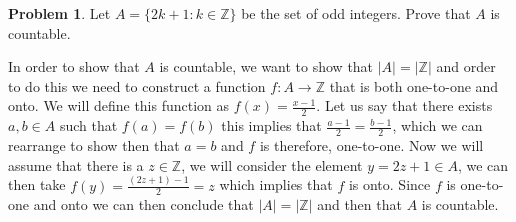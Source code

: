 \documentclass[11pt]{article}
\theoremstyle{definition}
\newtheorem{problem}{Problem}
\newcommand{\Z}{\mathbb{Z}}
\begin{document}
\begin{problem}
Let $A = \{ 2 k + 1 : k \in \Z\}$ be the set of odd integers. Prove that $A$ is countable. 
\end{problem}

In order to show that $A$ is countable, we want to show that $|A|=|\mathbb{Z}|$ and order to do this we need to construct a function $f:A \rightarrow \mathbb{Z}$ that is both one-to-one and onto. We will define this function as $f(x) = \frac{x-1}{2}$. Let us say that there exists $a,b\in A$ such that $f(a)=f(b)$ this implies that $\frac{a-1}{2} = \frac{b-1}{2}$, which we can rearrange to show then that $a=b$ and $f$ is therefore, one-to-one. Now we will assume that there is a $z\in \mathbb{Z}$, we will consider the element $y=2z+1\in A$, we can then take $f(y)=\frac{(2z+1)-1}{2} = z$ which implies that $f$ is onto. Since $f$ is one-to-one and onto we can then conclude that $|A|=|\mathbb{Z}|$ and then that $A$ is countable.
\end{document}
